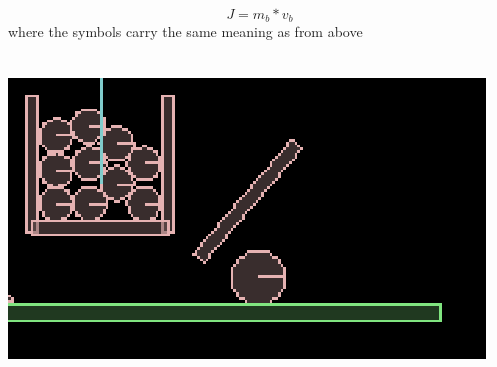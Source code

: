 \documentclass[11pt]{article}
\begin{document}
\begin{equation}J=m_b*v_b\end{equation}
where the symbols carry the same meaning as from above
\\
\\
\centerline{\includegraphics[scale=0.9]{13}}


\end{document}
